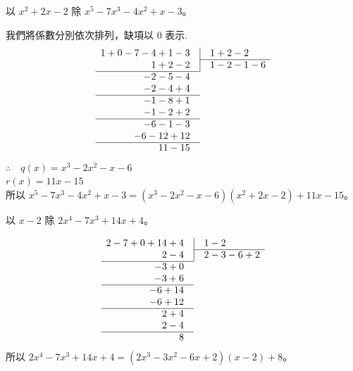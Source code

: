 \begin{example}\label{ex:5-4-5}
以 $x^2+2x-2$ 除 $x^5-7x^3-4x^2+x-3$。
\end{example}

\begin{solution*}
我們將係數分別依次排列，缺項以 $0$ 表示.
\begin{equation*}
\begin{array}{r@{\quad}l}
  1 + 0 - 7 - 4 + 1 - 3 & \vline\quad 1 + 2 - 2 \\ \cline{2-2}
  1 + 2 - 2 & \vline\quad 1 - 2 - 1 - 6 \\ \cline{1-1}
  - 2 - 5 - 4 & \\
  - 2 - 4 + 4 & \\ \cline{1-1}
  - 1 - 8 + 1 & \\
  - 1 - 2 + 2 & \\ \cline{1-1}
  - 6 - 1 - 3 & \\
  - 6 - 12 + 12 & \\ \cline{1-1}
  11 - 15 & 
\end{array}
\end{equation*}
$\therefore \quad q(x) = x^3-2x^2-x-6$ \\
\phantom{$\therefore \quad$} $r(x) = 11x-15$ \\
所以 $x^5-7x^3-4x^2+x-3 = (x^3-2x^2-x-6)(x^2+2x-2) + 11x-15$。
\end{solution*}

\begin{example}\label{ex:5-4-6}
以 $x-2$ 除 $2x^4-7x^3+14x+4$。
\end{example}

\begin{solution*}
\begin{equation*}
\begin{array}{r@{\quad}l}
  2 - 7 + 0 + 14 + 4 & \vline\quad 1 - 2 \\ \cline{2-2}
  2 - 4 & \vline\quad 2 - 3 - 6 + 2 \\ \cline{1-1}
  - 3 + 0 & \\
  - 3 + 6 & \\ \cline{1-1}
  - 6 + 14 & \\
  - 6 + 12 & \\ \cline{1-1}
  2 + 4 & \\
  2 - 4 & \\ \cline{1-1}
  8 & 
\end{array}
\end{equation*}
所以 $2x^4-7x^3+14x+4 = (2x^3-3x^2-6x+2)(x-2) + 8$。
\end{solution*}

